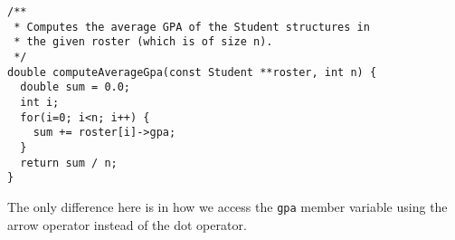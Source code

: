 \begin{verbatim}
/**
 * Computes the average GPA of the Student structures in
 * the given roster (which is of size n).
 */
double computeAverageGpa(const Student **roster, int n) {
  double sum = 0.0;
  int i;
  for(i=0; i<n; i++) {
    sum += roster[i]->gpa;
  }
  return sum / n;
}
\end{verbatim}

The only difference here is in how we access the \texttt{gpa}
member variable using the arrow operator instead of the dot 
operator.





